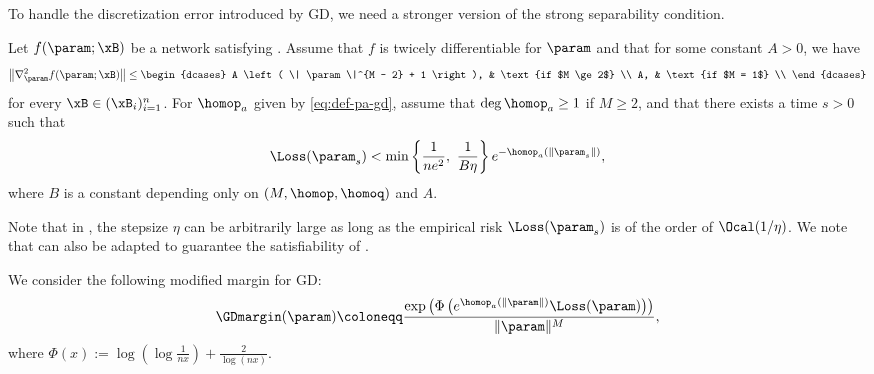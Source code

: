 To handle the discretization error introduced by GD, we need a stronger version of the strong separability condition. 
\begin{assumption}
\label{asp:initial-cond-gd}
Let $f(\param;\xB)$ be a network satisfying .
Assume that $f$ is twicely differentiable for $\param$ and %
that for some constant $A > 0$, we have
\begin{equation*}
    \left\| \nabla_{\param}^2 f(\param; \xB) \right\| \le
    \begin{dcases}
        A \left( \| \param \|^{M - 2} + 1 \right), & \text{if $M \ge 2$} \\
        A, & \text{if $M = 1$} \\
    \end{dcases} 
\end{equation*}
for every $\xB \in (\xB_i)_{i=1}^n$. 
For $\homop_a$ given by \cref{eq:def-pa-gd},
assume that $\deg \homop_a \ge 1$ if $M \ge 2$, and that there exists a time $s>0$ such that
\begin{equation*}%
    \Loss(\param_s) < \min \left\{ \frac{1}{n e^2}, \ \frac{1}{B \eta} \right\} e^{-\homop_a(\|\param_s\|)},
\end{equation*}
where $B$ is a constant depending only on $(M, \homop, \homoq)$ and $A$. 
\end{assumption}
Note that in , the stepsize $\eta$ can be arbitrarily large as long as the empirical risk $\Loss(\param_s)$ is of the order of $\Ocal(1/\eta)$.
We note that  can also be adapted to guarantee the satisfiability of .

We consider the following modified margin for GD:
\begin{equation}\label{eq:modified_margin_GD}
    \GDmargin(\param) \coloneqq \frac{\exp \left( \Phi \left( e^{\homop_a (\| \param \|)} \Loss(\param) \right) \right)}{\|\param\|^M},
\end{equation}
where $\Phi(x) := \log (\log \frac{1}{nx}) + \frac{2}{\log (nx)}$. 

